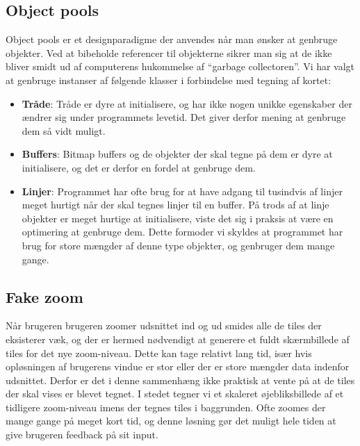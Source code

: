 \subsection{Object pools}
\label{subsec:objectPools}

Object pools er et designparadigme der anvendes når man ønsker at genbruge objekter. Ved at bibeholde referencer til objekterne sikrer man sig at de ikke bliver smidt ud af computerens hukommelse af ``garbage collectoren''. Vi har valgt at genbruge instanser af følgende klasser i forbindelse med tegning af kortet:

\begin{itemize}
	\item \textbf{Tråde}: Tråde er dyre at initialisere, og har ikke nogen unikke egenskaber der ændrer sig under programmets levetid. Det giver derfor mening at genbruge dem så vidt muligt.
	\item \textbf{Buffers}: Bitmap buffers og de objekter der skal tegne på dem er dyre at initialisere, og det er derfor en fordel at genbruge dem.
	\item \textbf{Linjer}: Programmet har ofte brug for at have adgang til tusindvis af linjer meget hurtigt når der skal tegnes linjer til en buffer. På trods af at linje objekter er meget hurtige at initialisere, viste det sig i praksis at være en optimering at genbruge dem. Dette formoder vi skyldes at programmet har brug for store mængder af denne type objekter, og genbruger dem mange gange.
\end{itemize}

\subsection{Fake zoom}
\label{subsec:fakeZoom}

Når brugeren brugeren zoomer udsnittet ind og ud smides alle de tiles der eksisterer væk, og der er hermed nødvendigt at generere et fuldt skærmbillede af tiles for det nye zoom-niveau. Dette kan tage relativt lang tid, især hvis opløsningen af brugerens vindue er stor eller der er store mængder data indenfor udsnittet. Derfor er det i denne sammenhæng ikke praktisk at vente på at de tiles der skal vises er blevet tegnet. I stedet tegner vi et skaleret øjebliksbillede af et tidligere zoom-niveau imens der tegnes tiles i baggrunden. Ofte zoomes der mange gange på meget kort tid, og denne løsning gør det muligt hele tiden at give brugeren feedback på sit input.